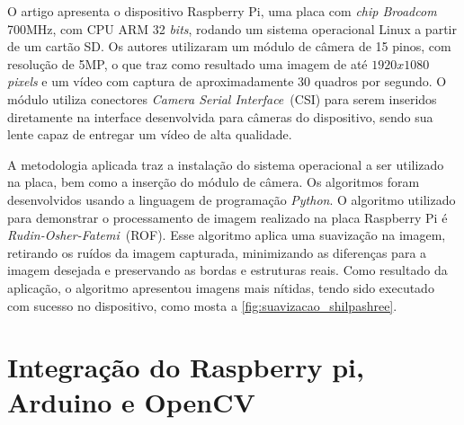 \documentclass[12pt,oneside,a4paper,chapter=TITLE,section=TITLE,sumario=tradicional]{abntex2}
\begin{document}
\begin{figure}[htb]
\end{figure}

\begin{figure}[htb]
\end{figure}

O artigo apresenta o dispositivo Raspberry Pi, uma placa com \textit{chip Broadcom} 700MHz, com CPU ARM 32 \textit{bits}, rodando um sistema operacional Linux a partir de um cartão SD. Os autores utilizaram um módulo de câmera de 15 pinos, com resolução de 5MP, o que traz como resultado uma imagem de até $1920 x 1080$ \textit{pixels} e um vídeo com captura de aproximadamente 30 quadros por segundo. O módulo utiliza conectores \textit{Camera Serial Interface}~(CSI) para serem inseridos diretamente na interface desenvolvida para câmeras do dispositivo, sendo sua lente capaz de entregar um vídeo de alta qualidade.

A metodologia aplicada traz a instalação do sistema operacional a ser utilizado na placa, bem como a inserção do módulo de câmera. Os algoritmos foram desenvolvidos usando a linguagem de programação \textit{Python}. O algoritmo utilizado para demonstrar o processamento de imagem realizado na placa Raspberry Pi é \textit{Rudin-Osher-Fatemi}~(ROF). Esse algoritmo aplica uma suavização na imagem, retirando os ruídos da imagem capturada, minimizando as diferenças para a imagem desejada e preservando as bordas e estruturas reais. Como resultado da aplicação, o algoritmo apresentou imagens mais nítidas, tendo sido executado com sucesso no dispositivo, como mosta a \autoref{fig:suavizacao_shilpashree}.

\begin{figure}[htb]
\end{figure}

\section{Integração do Raspberry pi, Arduino e OpenCV}
\end{document}

